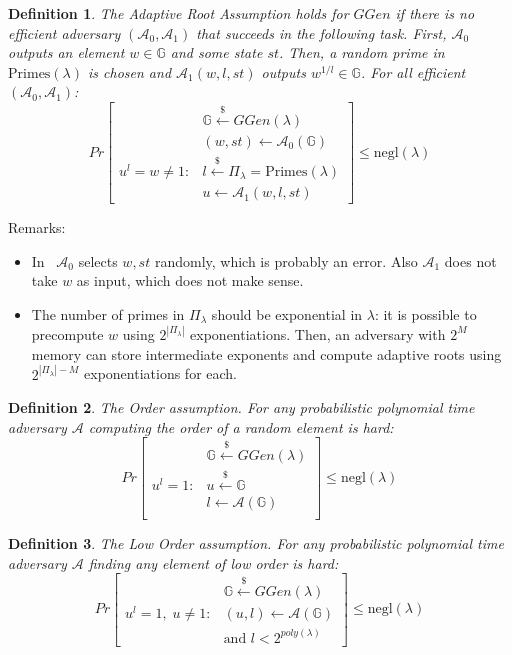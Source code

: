\documentclass[a4paper]{article}
\newtheorem{definition}{Definition}
\begin{document}
\begin{definition}
The \emph{Adaptive Root Assumption}   holds for
$GGen$ if there is no efficient adversary $(\mathcal{A}_0, \mathcal{A}_1)$ that succeeds in the following task. First,
$\mathcal{A}_0$  outputs an element $w\in \mathbb{G}$ and some state $st$. Then, a random prime in $\mathrm{Primes}(\lambda)$ is chosen
and $\mathcal{A}_1(w,l,st)$ outputs $w^{1/l}\in\mathbb{G}$. For all efficient $(\mathcal{A}_0, \mathcal{A}_1)$:
$$
Pr
\begin{bmatrix}
&\mathbb{G}\xleftarrow{\$}GGen(\lambda)\\
& (w,st)\xleftarrow{}\mathcal{A}_0(\mathbb{G})\\
u^l = w\neq 1 :& l\xleftarrow{\$}\Pi_{\lambda}=\mathrm{Primes}(\lambda)\\
&u \xleftarrow{} \mathcal{A}_1(w,l,st)
\end{bmatrix}\leq \mathrm{negl}(\lambda)
$$
\end{definition}
Remarks:
\begin{itemize}
    \item In~\cite{cryptoeprint:2019:1229} $\mathcal{A}_0$ selects $w,st$ randomly, which is probably an error. Also $\mathcal{A}_1$ does not take $w$ as input, which does not make sense.
    \item The number of primes in $\Pi_{\lambda}$ should be exponential in $\lambda$: it is possible to precompute $w$ using $2^{|\Pi_{\lambda}|}$ exponentiations. Then, an adversary with $2^M$ memory can store intermediate exponents and compute adaptive roots using $2^{|\Pi_{\lambda}|-M}$ exponentiations for each.
\end{itemize}
\begin{definition}
The \emph{Order assumption}. For any probabilistic polynomial time adversary $\mathcal{A}$ computing the order of a random element is hard: 
$$
Pr
\begin{bmatrix}
&\mathbb{G}\xleftarrow{\$}GGen(\lambda)\\
u^l = 1 : &u \xleftarrow{\$}\mathbb{G}\\ 
& l \xleftarrow{} \mathcal{A}(\mathbb{G})\\
\end{bmatrix}\leq \mathrm{negl}(\lambda)
$$

\end{definition}

\begin{definition}
The \emph{Low Order assumption}. For any probabilistic polynomial time adversary $\mathcal{A}$ finding any element of low order is hard: 
$$
Pr
\begin{bmatrix}
&\mathbb{G}\xleftarrow{\$}GGen(\lambda)\\
u^l = 1,\;u\neq 1 :
& (u,l) \xleftarrow{} \mathcal{A}(\mathbb{G})\\
& \text{and }l<2^{poly(\lambda)}
\end{bmatrix}\leq \mathrm{negl}(\lambda)
$$

\end{definition}
\end{document}
